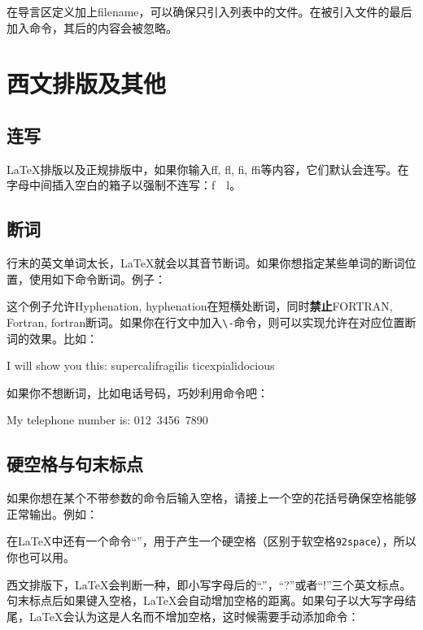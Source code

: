 在导言区定义加上filename，可以确保只引入列表中的文件。在被引入文件的最后加入命令，其后的内容会被忽略。

\section{西文排版及其他}
\subsection{连写}
\LaTeX 排版以及正规排版中，如果你输入ff, fl, fi, ffi等内容，它们默认会连写。在字母中间插入空白的箱子以强制不连写：f~~l。

\subsection{断词}
行末的英文单词太长，\LaTeX 就会以其音节断词。如果你想指定某些单词的断词位置，使用如下命令断词。例子：
\begin{latex}
\end{latex}

这个例子允许Hyphenation, hyphenation在短横处断词，同时\textbf{禁止}FORTRAN, Fortran, fortran断词。如果你在行文中加入\verb|\-|命令，则可以实现允许在对应位置断词的效果。比如：

\begin{codeshow}
I will show you this:
su\-per\-cal\-i\-frag\-i\-lis\-%
tic\-ex\-pi\-al\-i\-do\-cious
\end{codeshow}

如果你不想断词，比如电话号码，巧妙利用命令吧：
\begin{latex}
My telephone number is: \mbox{012 3456 7890}
\end{latex}

\subsection{硬空格与句末标点}
如果你想在某个不带参数的命令后输入空格，请接上一个空的花括号确保空格能够正常输出。例如：

在\LaTeX 中还有一个命令“\texttt{\textvisiblespace}”，用于产生一个硬空格（区别于软空格\texttt{\char92space}），所以你也可以用。

西文排版下，\LaTeX 会判断一种，即小写字母后的“.”，“?”或者“!”三个英文标点。句末标点后如果键入空格，\LaTeX 会自动增加空格的距离。如果句子以大写字母结尾，\LaTeX 会认为这是人名而不增加空格，这时候需要手动添加命令：

